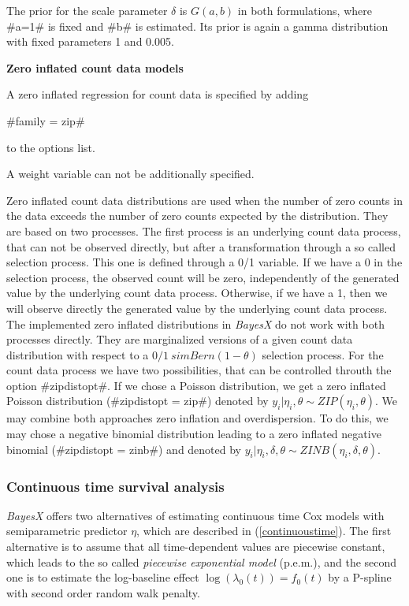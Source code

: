 The prior for the scale parameter $\delta$ is $G(a,b)$ in both
formulations, where #a=1# is fixed and #b# is estimated. Its prior
is again a gamma distribution with fixed parameters 1 and 0.005.

{\bf Zero inflated count data models}

A zero inflated regression for count data is specified by adding

#family = zip#

to the options list.

A weight variable can not be additionally specified.

Zero inflated count data distributions are used when the
number of zero counts in the data exceeds the number of
zero counts expected by the distribution. They are based on
two processes. The first process is an underlying count data
process, that can not be observed directly, but after a
transformation through a so called selection process. This
one is defined through a 0/1 variable. If we have a 0 in the
selection process, the observed count will be zero, independently
of the generated value by the underlying count data process.
Otherwise, if we have a 1, then we will observe directly the
generated value by the underlying count data process.
The implemented zero inflated distributions in {\em BayesX}
do not work with both processes directly. They are marginalized
versions of a given count data distribution with respect to
a $0/1 ~sim Bern(1-\theta)$ selection process. For the count
data process we have two possibilities, that can be controlled
throuth the option #zipdistopt#. If we chose a Poisson distribution,
we get a zero inflated Poisson distribution (#zipdistopt = zip#)
denoted by $y_i | \eta_i,\theta \sim ZIP(\eta_i,\theta)$.
We may combine both approaches zero inflation and overdispersion.
To do this, we may chose a negative binomial distribution leading
to a zero inflated negative binomial (#zipdistopt = zinb#) and
denoted by $y_i | \eta_i,\delta, \theta \sim ZINB(\eta_i,\delta,\theta)$.


\subsubsection{Continuous time survival analysis}
\label{cont_survivalAnalysis}

\textit{BayesX} offers two alternatives of estimating continuous
time Cox models with semiparametric predictor $\eta$, which are
described in (\autoref{continuoustime}). The first alternative is
to assume that all time-dependent values are piecewise constant,
which leads to the so called \textit{piecewise exponential model}
(p.e.m.), and the second one is to estimate the log-baseline
effect $\log(\lambda_0(t))=f_0(t)$ by a P-spline with second order
random walk penalty.

